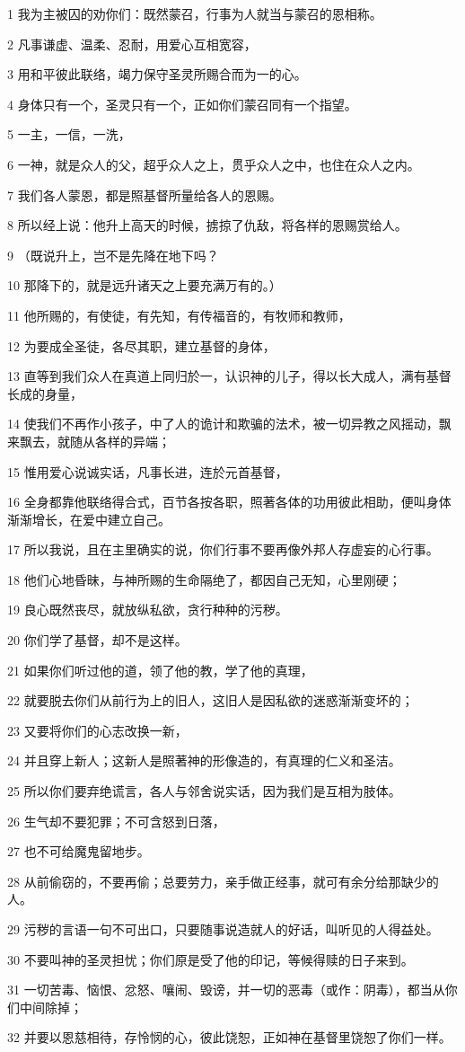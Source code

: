 \par 1 我为主被囚的劝你们：既然蒙召，行事为人就当与蒙召的恩相称。
\par 2 凡事谦虚、温柔、忍耐，用爱心互相宽容，
\par 3 用和平彼此联络，竭力保守圣灵所赐合而为一的心。
\par 4 身体只有一个，圣灵只有一个，正如你们蒙召同有一个指望。
\par 5 一主，一信，一洗，
\par 6 一神，就是众人的父，超乎众人之上，贯乎众人之中，也住在众人之内。
\par 7 我们各人蒙恩，都是照基督所量给各人的恩赐。
\par 8 所以经上说：他升上高天的时候，掳掠了仇敌，将各样的恩赐赏给人。
\par 9 （既说升上，岂不是先降在地下吗？
\par 10 那降下的，就是远升诸天之上要充满万有的。）
\par 11 他所赐的，有使徒，有先知，有传福音的，有牧师和教师，
\par 12 为要成全圣徒，各尽其职，建立基督的身体，
\par 13 直等到我们众人在真道上同归於一，认识神的儿子，得以长大成人，满有基督长成的身量，
\par 14 使我们不再作小孩子，中了人的诡计和欺骗的法术，被一切异教之风摇动，飘来飘去，就随从各样的异端；
\par 15 惟用爱心说诚实话，凡事长进，连於元首基督，
\par 16 全身都靠他联络得合式，百节各按各职，照著各体的功用彼此相助，便叫身体渐渐增长，在爱中建立自己。
\par 17 所以我说，且在主里确实的说，你们行事不要再像外邦人存虚妄的心行事。
\par 18 他们心地昏昧，与神所赐的生命隔绝了，都因自己无知，心里刚硬；
\par 19 良心既然丧尽，就放纵私欲，贪行种种的污秽。
\par 20 你们学了基督，却不是这样。
\par 21 如果你们听过他的道，领了他的教，学了他的真理，
\par 22 就要脱去你们从前行为上的旧人，这旧人是因私欲的迷惑渐渐变坏的；
\par 23 又要将你们的心志改换一新，
\par 24 并且穿上新人；这新人是照著神的形像造的，有真理的仁义和圣洁。
\par 25 所以你们要弃绝谎言，各人与邻舍说实话，因为我们是互相为肢体。
\par 26 生气却不要犯罪；不可含怒到日落，
\par 27 也不可给魔鬼留地步。
\par 28 从前偷窃的，不要再偷；总要劳力，亲手做正经事，就可有余分给那缺少的人。
\par 29 污秽的言语一句不可出口，只要随事说造就人的好话，叫听见的人得益处。
\par 30 不要叫神的圣灵担忧；你们原是受了他的印记，等候得赎的日子来到。
\par 31 一切苦毒、恼恨、忿怒、嚷闹、毁谤，并一切的恶毒（或作：阴毒），都当从你们中间除掉；
\par 32 并要以恩慈相待，存怜悯的心，彼此饶恕，正如神在基督里饶恕了你们一样。

